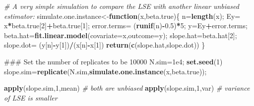 \documentclass[12pt,]{book}
\newenvironment{Shaded}{\begin{snugshade}}{\end{snugshade}}
\newcommand{\KeywordTok}[1]{\textcolor[rgb]{0.13,0.29,0.53}{\textbf{#1}}}
\newcommand{\DataTypeTok}[1]{\textcolor[rgb]{0.13,0.29,0.53}{#1}}
\newcommand{\DecValTok}[1]{\textcolor[rgb]{0.00,0.00,0.81}{#1}}
\newcommand{\FloatTok}[1]{\textcolor[rgb]{0.00,0.00,0.81}{#1}}
\newcommand{\StringTok}[1]{\textcolor[rgb]{0.31,0.60,0.02}{#1}}
\newcommand{\CommentTok}[1]{\textcolor[rgb]{0.56,0.35,0.01}{\textit{#1}}}
\newcommand{\ControlFlowTok}[1]{\textcolor[rgb]{0.13,0.29,0.53}{\textbf{#1}}}
\newcommand{\OperatorTok}[1]{\textcolor[rgb]{0.81,0.36,0.00}{\textbf{#1}}}
\newcommand{\NormalTok}[1]{#1}
\begin{document}
\begin{Shaded}
\begin{Highlighting}[]
\CommentTok{# A very simple simulation to compare the LSE with another linear unbiased estimator: }
\NormalTok{simulate.one.instance<-}\ControlFlowTok{function}\NormalTok{(x,beta.true)\{}
\NormalTok{  n=}\KeywordTok{length}\NormalTok{(x);}
\NormalTok{  Ey=}\StringTok{ }\NormalTok{x}\OperatorTok{*}\NormalTok{beta.true[}\DecValTok{2}\NormalTok{]}\OperatorTok{+}\NormalTok{beta.true[}\DecValTok{1}\NormalTok{];}
\NormalTok{  error.terms=}\StringTok{ }\NormalTok{(}\KeywordTok{runif}\NormalTok{(n)}\OperatorTok{-}\FloatTok{0.5}\NormalTok{)}\OperatorTok{*}\DecValTok{5}\NormalTok{;}
\NormalTok{  y=Ey}\OperatorTok{+}\NormalTok{error.terms;}
\NormalTok{  beta.hat=}\KeywordTok{fit.linear.model}\NormalTok{(}\DataTypeTok{covariate=}\NormalTok{x,}\DataTypeTok{outcome=}\NormalTok{y);}
\NormalTok{  slope.hat=beta.hat[}\DecValTok{2}\NormalTok{];}
\NormalTok{  slope.dot=}\StringTok{ }\NormalTok{(y[n]}\OperatorTok{-}\NormalTok{y[}\DecValTok{1}\NormalTok{])}\OperatorTok{/}\NormalTok{(x[n]}\OperatorTok{-}\NormalTok{x[}\DecValTok{1}\NormalTok{])}
  \KeywordTok{return}\NormalTok{(}\KeywordTok{c}\NormalTok{(slope.hat,slope.dot))}
\NormalTok{\}}

\NormalTok{### Set the number of replicates to be 10000}
\NormalTok{N.sim=}\FloatTok{1e4}\NormalTok{;}
\KeywordTok{set.seed}\NormalTok{(}\DecValTok{1}\NormalTok{)}
\NormalTok{slope.sim=}\KeywordTok{replicate}\NormalTok{(N.sim,}\KeywordTok{simulate.one.instance}\NormalTok{(x,beta.true));}

\KeywordTok{apply}\NormalTok{(slope.sim,}\DecValTok{1}\NormalTok{,mean) }\CommentTok{# both are unbiased}
\KeywordTok{apply}\NormalTok{(slope.sim,}\DecValTok{1}\NormalTok{,var) }\CommentTok{# variance of LSE is smaller}
\end{Highlighting}
\end{Shaded}
\end{document}
